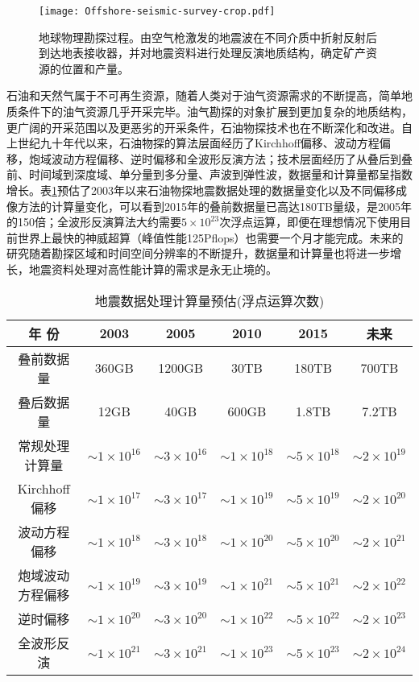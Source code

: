 \begin{figure}[t]
  \centering
  \texttt{[image: Offshore-seismic-survey-crop.pdf]}
  \caption{地球物理勘探过程。由空气枪激发的地震波在不同介质中折射反射后到达地表接收器，并对地震资料进行处理反演地质结构，确定矿产资源的位置和产量。}
  \label{fig:offshoreseismicsurvey}
\end{figure}

石油和天然气属于不可再生资源，随着人类对于油气资源需求的不断提高，简单地质条件下的油气资源几乎开采完毕。油气勘探的对象扩展到更加复杂的地质结构，更广阔的开采范围以及更恶劣的开采条件，石油物探技术也在不断深化和改进。自上世纪九十年代以来，石油物探的算法层面经历了Kirchhoff偏移\cite{yilmaz2001seismic}、波动方程偏移\cite{rickett2002offset}，炮域波动方程偏移\cite{zhang2005theory}、逆时偏移\cite{baysal1983reverse}和全波形反演方法\cite{tarantola1984inversion}；技术层面经历了从叠后到叠前、时间域到深度域、单分量到多分量、声波到弹性波，数据量和计算量都呈指数增长\cite{赵改善2009高性能计算在石油物探中的应用现状与前景}。表\ref{tb:oilcomputing}预估了2003年以来石油物探地震数据处理的数据量变化以及不同偏移成像方法的计算量变化\cite{赵改善2009高性能计算在石油物探中的应用现状与前景}，可以看到2015年的叠前数据量已高达180TB量级，是2005年的150倍；全波形反演算法大约需要$5\times10^{23}$次浮点运算，即便在理想情况下使用目前世界上最快的神威超算（峰值性能125Pflops）也需要一个月才能完成。未来的研究随着勘探区域和时间空间分辨率的不断提升，数据量和计算量也将进一步增长，地震资料处理对高性能计算的需求是永无止境的。

\begin{table}[ht]
\centering
\caption{地震数据处理计算量预估(浮点运算次数)}
\label{tb:oilcomputing}
\begin{tabular}{cccccc}
\hline
年    份      & 2003         & 2005         & 2010         & 2015         & 未来           \\ \hline
叠前数据量       & 360GB        & 1200GB       & 30TB         & 180TB        & 700TB        \\ 
叠后数据量       & 12GB         & 40GB         & 600GB        & 1.8TB        & 7.2TB        \\ 
常规处理计算量   & $\sim1\times10^{16}$ & $\sim3\times10^{16}$ & $\sim1\times10^{18}$ & $\sim5\times10^{18}$ & $\sim2\times10^{19}$ \\ 
Kirchhoff偏移    & $\sim1\times10^{17}$ & $\sim3\times10^{17}$ & $\sim1\times10^{19}$ & $\sim5\times10^{19}$ & $\sim2\times10^{20}$ \\ 
波动方程偏移     & $\sim1\times10^{18}$ & $\sim3\times10^{18}$ & $\sim1\times10^{20}$ & $\sim5\times10^{20}$ & $\sim2\times10^{21}$ \\ 
炮域波动方程偏移 & $\sim1\times10^{19}$ & $\sim3\times10^{19}$ & $\sim1\times10^{21}$ & $\sim5\times10^{21}$ & $\sim2\times10^{22}$ \\ 
逆时偏移         & $\sim1\times10^{20}$ & $\sim3\times10^{20}$ & $\sim1\times10^{22}$ & $\sim5\times10^{22}$ & $\sim2\times10^{23}$ \\ 
全波形反演       & $\sim1\times10^{21}$ & $\sim3\times10^{21}$ & $\sim1\times10^{23}$ & $\sim5\times10^{23}$ & $\sim2\times10^{24}$ \\ 
\hline
\end{tabular}
\end{table}

